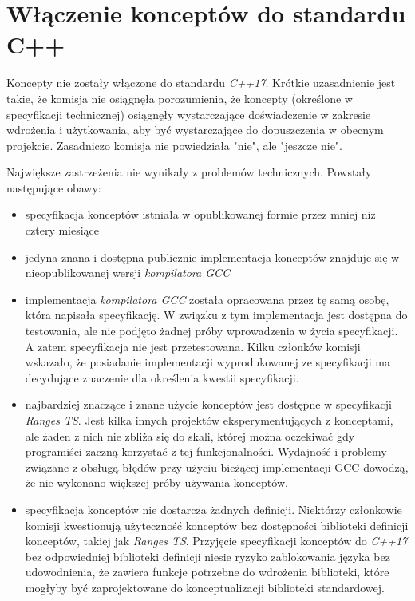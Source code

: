 \documentclass[11pt, a4paper]{article}
\begin{document}
\lstset{language=C++}

\section{Włączenie konceptów do standardu C++}

Koncepty nie zostały włączone do standardu \emph{C++17}. Krótkie uzasadnienie jest takie, że komisja nie osiągnęła porozumienia, że koncepty (określone w specyfikacji technicznej) osiągnęły wystarczające doświadczenie w zakresie wdrożenia i użytkowania, aby być wystarczające do dopuszczenia w obecnym projekcie. Zasadniczo komisja nie powiedziała "nie", ale "jeszcze nie".

Największe zastrzeżenia nie wynikały z problemów technicznych. Powstały następujące obawy:

\begin{itemize}

\item specyfikacja konceptów istniała w opublikowanej formie przez mniej niż cztery miesiące
\item jedyna znana i dostępna publicznie implementacja konceptów znajduje się w nieopublikowanej wersji \emph{kompilatora GCC}
\item implementacja \emph{kompilatora GCC} została opracowana przez tę samą osobę, która napisała specyfikację. W związku z tym implementacja jest dostępna do testowania, ale nie podjęto żadnej próby wprowadzenia w życia specyfikacji. A zatem specyfikacja nie jest przetestowana. Kilku członków komisji wskazało, że posiadanie implementacji wyprodukowanej ze specyfikacji ma decydujące znaczenie dla określenia kwestii specyfikacji.
\item najbardziej znaczące i znane użycie konceptów jest dostępne w specyfikacji \emph{Ranges TS}. Jest kilka innych projektów eksperymentujących z konceptami, ale żaden z nich nie zbliża się do skali, której można oczekiwać gdy programiści zaczną korzystać z tej funkcjonalności. Wydajność i problemy związane z obsługą błędów przy użyciu bieżącej implementacji GCC dowodzą, że nie wykonano większej próby używania konceptów.
\item specyfikacja konceptów nie dostarcza żadnych definicji. Niektórzy członkowie komisji kwestionują użyteczność konceptów bez dostępności biblioteki definicji konceptów, takiej jak \emph{Ranges TS}. Przyjęcie specyfikacji konceptów do \emph{C++17} bez odpowiedniej biblioteki definicji niesie ryzyko zablokowania języka bez udowodnienia, że zawiera funkcje potrzebne do wdrożenia biblioteki, które mogłyby być zaprojektowane do konceptualizacji biblioteki standardowej.

\end{itemize}
\end{document}
